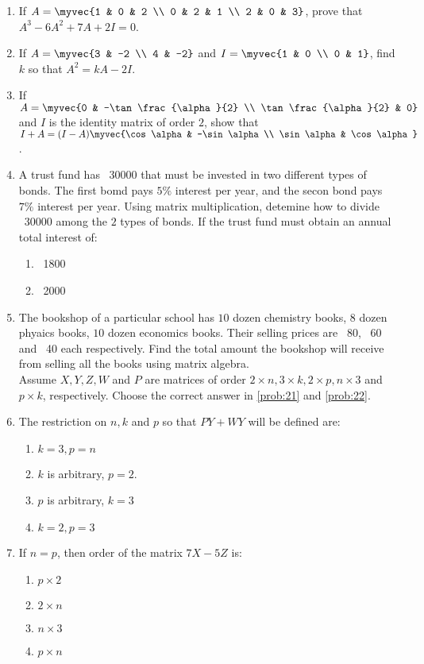 \begin{enumerate}
\item If $A=\myvec
{1 & 0 & 2 \\ 0 & 2 & 1 \\ 2 & 0 & 3}$, prove that $A^3-6A^2+7A+2I=0$.
\item If $A=\myvec
{3 & -2 \\ 4 & -2}$ and $I=\myvec
{1 & 0 \\ 0 & 1}$, find $k$ so that $A^2=kA-2I$.
\item If $A=\myvec
{0 & -\tan \frac{\alpha}{2} \\ \tan \frac{\alpha}{2} & 0}$  and $I$ is the identity matrix of order $2$, show that $I+A= (I-A) \myvec
{\cos \alpha & -\sin \alpha \\ \sin \alpha & \cos \alpha}$.
\item A trust fund has \rupee~30000 that must be invested in two different types of bonds. The first bomd pays $5\%$  interest per year, and the secon bond pays $7\%$ interest per year. Using matrix multiplication, detemine how to divide \rupee~30000 among the $2$ types of bonds. If the trust fund must obtain an annual total interest of:
\begin{enumerate}
\item \rupee~1800
\item \rupee~2000
\end{enumerate}
\item The bookshop of a particular school has $10$ dozen chemistry books, $8$ dozen phyaics books, $10$ dozen economics books. Their selling prices are \rupee~80, \rupee~60 and \rupee~40 each respectively. Find the total amount the bookshop will receive from selling all the books using matrix algebra.
\\ Assume $X, Y, Z,  W$ and $P$ are matrices of order $2\times n, 3\times k, 2\times p, n\times 3$  and $p\times k$, respectively. Choose the correct answer in  \ref{prob:21} and \ref{prob:22}.
\item The restriction on $n, k$ and $p$ so that $PY+WY$ will be defined are:\label{prob:21}
\begin{enumerate}
\item $k=3, p=n$
\item $k$ is arbitrary, $p=2$.
\item $p$ is arbitrary, $k=3$
\item $k=2, p=3$
\end{enumerate}
\item If $n=p$, then order of the matrix $7X-5Z$ is:\label{prob:22}
\begin{enumerate}
\item $p\times 2$
\item $2\times n$
\item $n\times 3$
\item $p\times n$
\end{enumerate}
\end{enumerate}




  




